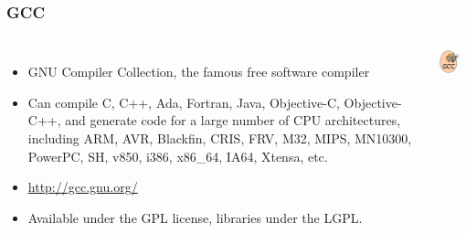 \begin{frame}
  \frametitle{GCC}
  \begin{columns}
    \begin{itemize}
    \item GNU Compiler Collection, the famous free software compiler
    \item Can compile C, C++, Ada, Fortran, Java, Objective-C,
      Objective-C++, and generate code for a large number of CPU
      architectures, including ARM, AVR, Blackfin, CRIS, FRV, M32, MIPS,
      MN10300, PowerPC, SH, v850, i386, x86\_64, IA64, Xtensa, etc.
    \item \url{http://gcc.gnu.org/}
    \item Available under the GPL license, libraries under the LGPL.
    \end{itemize}
    \includegraphics[width=0.7\textwidth]{slides/sysdev-toolchains-definition/gcc.png}
  \end{columns}
\end{frame}

